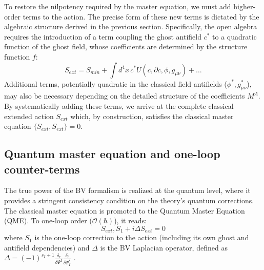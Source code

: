 \documentclass[twocolumn]{aastex631}
\begin{document}
To restore the nilpotency required by the master equation, we must add higher-order terms to the action. The precise form of these new terms is dictated by the algebraic structure derived in the previous section. Specifically, the open algebra requires the introduction of a term coupling the ghost antifield $c^*$ to a quadratic function of the ghost field, whose coefficients are determined by the structure function $f$:
\begin{equation}
S_{ext} = S_{min} + \int d^4x \, c^* U(c, \partial c, \phi, g_{\mu\nu}) + \dots
\end{equation}
Additional terms, potentially quadratic in the classical field antifields ($\phi^*, g_{\mu\nu}^*$), may also be necessary depending on the detailed structure of the coefficients $M^A$. By systematically adding these terms, we arrive at the complete classical extended action $S_{ext}$ which, by construction, satisfies the classical master equation $\{S_{ext}, S_{ext}\} = 0$.

\subsection{Quantum master equation and one-loop counter-terms}
The true power of the BV formalism is realized at the quantum level, where it provides a stringent consistency condition on the theory's quantum corrections. The classical master equation is promoted to the Quantum Master Equation (QME). To one-loop order ($\mathcal{O}(\hbar)$), it reads:
\begin{equation}
{S_{ext}, S_1} + i \Delta S_{ext} = 0
\end{equation}
where $S_1$ is the one-loop correction to the action (including its own ghost and antifield dependencies) \citep{fernández2023oneloopcorrectionscelestialchiral} and $\Delta$ is the BV Laplacian operator, defined as $\Delta = (-1)^{s_I+1} \frac{\delta_r}{\delta \Psi^I} \frac{\delta_l}{\delta \Psi^*_I}$ \citep{fernández2023oneloopcorrectionscelestialchiral}.
\end{document}
